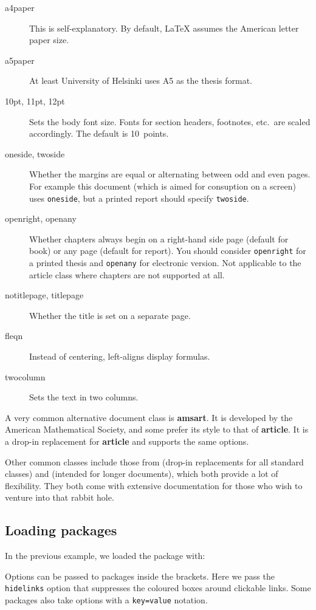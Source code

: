 \begin{description}
\item[a4paper] This is self-explanatory.
    By default, \LaTeX{} assumes the American letter paper size.
\item[a5paper] At least University of Helsinki uses A5 as the thesis format.
\item[10pt, 11pt, 12pt] Sets the body font size.
    Fonts for section headers, footnotes, etc.\ are scaled accordingly.
    The default is 10~points.
\item[oneside, twoside] Whether the margins are equal
    or alternating between odd and even pages.
    For example this document (which is aimed for consuption on a screen)
    uses \verb|oneside|, but a printed report should specify \verb|twoside|.
\item[openright, openany]
    Whether chapters always begin on a right-hand side page (default for book)
    or any page (default for report).
    You should consider \verb|openright| for a printed thesis
    and \verb|openany| for electronic version.
    Not applicable to the article class where chapters are not supported at all.
\item[notitlepage, titlepage] Whether the title is set on a separate page.
\item[fleqn] Instead of centering, left-aligns display formulas.
\item[twocolumn] Sets the text in two columns.
\end{description}


A very common alternative document class is \textbf{amsart}.
It is developed by the American Mathematical Society,
and some prefer its style to that of \textbf{article}.
It is a drop-in replacement for \textbf{article} and supports the same options.

Other common classes include those from 
(drop-in replacements for all standard classes)
and  (intended for longer documents),
which both provide a lot of flexibility.
They both come with extensive documentation for those who wish to venture into that rabbit hole.


%
\subsection{Loading packages}\label{sec:loading packages}

In the previous example, we loaded the  package with:
\begin{ExampleCode}
\usepackage[hidelinks]{hyperref}
\end{ExampleCode}
Options can be passed to packages inside the brackets.
Here we pass the \verb|hidelinks| option that suppresses the coloured boxes around clickable links.
Some packages also take options with a \verb|key=value| notation.

